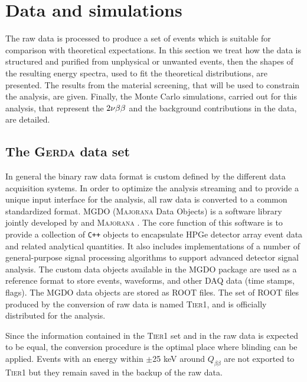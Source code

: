 \section{Data and simulations}\label{sec:data}
The raw data is processed to produce a set of events which is suitable for comparison with theoretical expectations. In this section we treat how the data is structured and purified from unphysical or unwanted events, then the shapes of the resulting energy spectra, used to fit the theoretical distributions, are presented. The results from the material screening, that will be used to constrain the analysis, are given. Finally, the Monte Carlo simulations, carried out for this analysis, that represent the $2\nu\beta\beta$ and the background contributions in the data, are detailed.
\subsection*{The \textsc{Gerda} data set}
 In general the binary raw data format is custom defined by the different data acquisition systems. In order to optimize the analysis streaming and to provide a unique input interface for the analysis, all raw data is converted to a common standardized format. MGDO \cite{MGDO} (\textsc{Majorana} {\gerda} Data Objects) is a software library jointly developed by {\gerda} and \textsc{Majorana} \cite{majoranadem}. The core function of this software is to provide a collection of \texttt{C++} objects to encapsulate HPGe detector array event data and related analytical quantities. It also includes implementations of a number of general-purpose signal processing algorithms to support advanced detector signal analysis. The custom data objects available in the MGDO package are used as a reference format to store events, waveforms, and other DAQ data (time stamps, flags). The MGDO data objects are stored as ROOT \cite{ROOT} files. The set of ROOT files produced by the conversion of raw data is named \textsc{Tier1}, and is officially distributed for the analysis.

Since the information contained in the \textsc{Tier1} set and in the raw data is expected to be equal, the conversion procedure is the optimal place where blinding can be applied. Events with an energy within $\pm$25 keV around $Q_{\beta\beta}$ are not exported to \textsc{Tier1} but they remain saved in the backup of the raw data.

